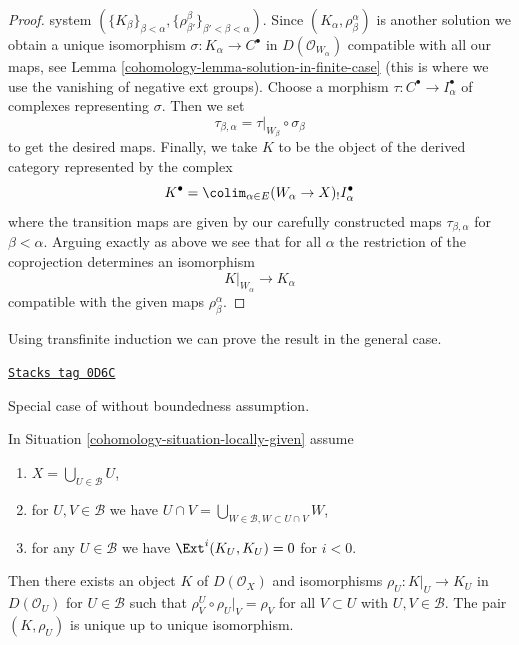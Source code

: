 \begin{proof}
system $(\{K_\beta\}_{\beta < \alpha},
\{\rho^\beta_{\beta'}\}_{\beta' < \beta < \alpha})$.
Since $(K_\alpha, \rho^\alpha_\beta)$ is another solution
we obtain a unique isomorphism $\sigma : K_\alpha \to C^\bullet$
in $D(\mathcal{O}_{W_\alpha})$ compatible with all our maps, see
Lemma \ref{cohomology-lemma-solution-in-finite-case}
(this is where we use the vanishing of negative ext groups).
Choose a morphism $\tau : C^\bullet \to I_\alpha^\bullet$
of complexes representing $\sigma$. Then we set
$$
\tau_{\beta, \alpha} = \tau|_{W_\beta} \circ \sigma_\beta
$$
to get the desired maps. Finally, we take $K$ to be the object of the derived
category represented by the complex
$$
K^\bullet = \colim_{\alpha \in E} (W_\alpha \to X)_!I_\alpha^\bullet
$$
where the transition maps are given by our carefully constructed
maps $\tau_{\beta, \alpha}$ for $\beta < \alpha$.
Arguing exactly as above we see that for all $\alpha$
the restriction of the coprojection determines an isomorphism
$$
K|_{W_\alpha} \longrightarrow K_\alpha
$$
compatible with the given maps $\rho^\alpha_\beta$.
\end{proof}

Using transfinite induction we can prove the result in the general case.

\begin{theorem}

\label{cohomology-theorem-glueing-bbd-general}
\href{https://stacks.math.columbia.edu/tag/0D6C}{\texttt{Stacks tag 0D6C}}

\begin{reference}
Special case of \cite[Theorem 3.2.4]{BBD}
without boundedness assumption.
\end{reference}
In Situation \ref{cohomology-situation-locally-given} assume
\begin{enumerate}
\item $X = \bigcup_{U \in \mathcal{B}} U$,
\item for $U, V \in \mathcal{B}$ we have
$U \cap V = \bigcup_{W \in \mathcal{B}, W \subset U \cap V} W$,
\item for any $U \in \mathcal{B}$ we have $\Ext^i(K_U, K_U) = 0$
for $i < 0$.
\end{enumerate}
Then there exists an object $K$ of $D(\mathcal{O}_X)$
and isomorphisms $\rho_U : K|_U \to K_U$ in $D(\mathcal{O}_U)$ for
$U \in \mathcal{B}$ such that $\rho^U_V \circ \rho_U|_V = \rho_V$
for all $V \subset U$ with $U, V \in \mathcal{B}$.
The pair $(K, \rho_U)$ is unique up to unique isomorphism.
\end{theorem}

